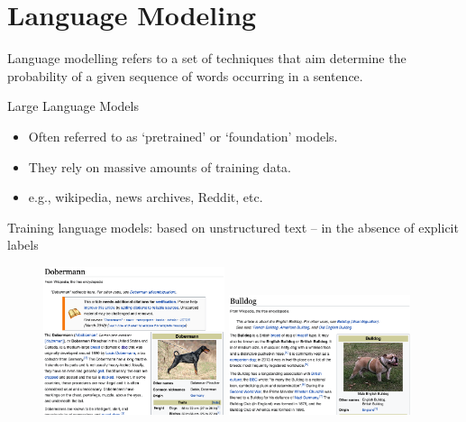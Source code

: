 \documentclass[compress]{beamer}
\begin{document}
\section{Language Modeling}

\begin{frame}
Language modelling refers to a set of techniques that aim determine the probability of a given sequence of words occurring in a sentence.
\end{frame}

\begin{frame}{Large Language Models}
	\begin{itemize}
		\item Often referred to as `pretrained' or `foundation' models.
		\item They rely on massive amounts of training data. 
		\item e.g., wikipedia, news archives, Reddit, etc. 
	\end{itemize}
\end{frame}

\begin{frame} {Training language models: based on unstructured text -- in the absence of explicit labels}
	\begin{figure}
		\includegraphics[width=0.475\textwidth]{dobermann.png}
		\hfill
		\includegraphics[width=0.475\textwidth]{bulldog.png}
	\end{figure}
\end{frame}
\end{document}
